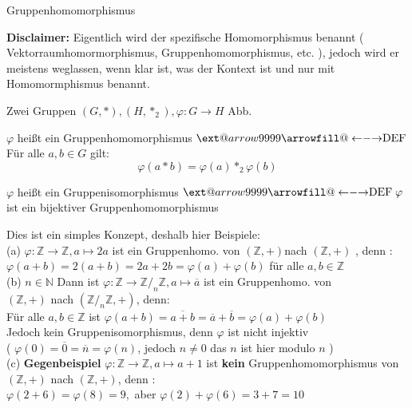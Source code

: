 \documentclass[headsepline,12pt,a4paper]{scrartcl}
\makeatletter
\newcommand\xleftrightarrow[2][]{%
  \ext@arrow 9999{\longleftrightarrowfill@}{#1}{#2}}
\newcommand\longleftrightarrowfill@{%
  \arrowfill@\leftarrow\relbar\rightarrow}
\makeatother
\begin{document}
\begin{center}
\item[Gruppenhomomorphismus]
\end{center}
\item \textbf{Disclaimer:} Eigentlich wird der spezifische Homomorphismus benannt ( Vektorraumhomormorphismus, Gruppenhomomorphismus, etc. ), jedoch wird er meistens weglassen, wenn klar ist, was der Kontext ist und nur mit Homomormphismus benannt. \\
\item Zwei Gruppen $(G,*), (H,*_2) , \varphi: G\rightarrow H $ Abb.
\item  $\varphi$  heißt ein Gruppenhomomorphismus $ \xleftrightarrow{\text{DEF}} $ Für alle $a,b \in G $ gilt: 
$$ \varphi(a*b) = \varphi(a) *_2 \varphi(b) $$
\item  $\varphi$  heißt ein Gruppenisomorphismus $ \xleftrightarrow{\text{DEF}} \; \varphi $ ist ein bijektiver Gruppenhomomorphismus 
\item Dies ist ein simples Konzept, deshalb hier Beispiele:  \\
(a) $ \varphi : \mathbb{Z} \rightarrow \mathbb{Z} , a \mapsto 2a $ ist ein Gruppenhomo. von $(\mathbb{Z}, + ) $nach $(\mathbb{Z}, + ) $ , denn : \\
$\varphi(a+b) = 2 (a+b) = 2a + 2b = \varphi (a) + \varphi (b) $ für alle $ a,b \in \mathbb{Z} $ \\

(b) $ n \in \mathbb{N} $ Dann ist $ \varphi : \mathbb{Z} \rightarrow \mathbb{Z} /_n \mathbb{Z} , a \mapsto \overline{a} $ ist ein Gruppenhomo. von \\
$( \mathbb{Z}, + ) $ nach  $(\mathbb{Z} /_n \mathbb{Z},+)$, denn: \\
Für alle $a,b \in \mathbb{Z} $ ist $ \varphi(a+b) = \overline{a+b} = \overline{a} + \overline{b} = \varphi(a) + \varphi (b) $ \\
Jedoch kein Gruppenisomorphismus, denn $ \varphi $ ist nicht injektiv \\
( $ \varphi(0) = \overline{0} = \overline{n} = \varphi(n) $, jedoch $ n \neq 0 $ das $n$ ist hier modulo $n$ ) \\
 
(c) \textbf{Gegenbeispiel} $ \varphi: \mathbb{Z} \rightarrow \mathbb{Z} , a \mapsto a+1 $ ist \textbf{kein} Gruppenhomomorphismus von \\
$(\mathbb{Z},+)$ nach $( \mathbb{Z}, + )$, denn : \\
$ \varphi(2+6) = \varphi(8) = 9 , $ aber $ \varphi(2)+ \varphi(6) = 3+7=10 $
\end{document}
